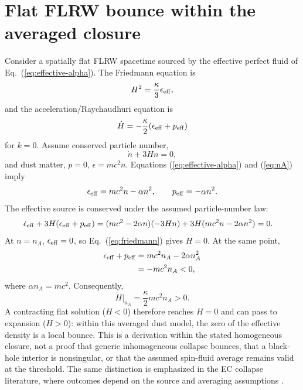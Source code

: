 \documentclass[11pt]{article}
\begin{document}
\section{Flat FLRW bounce within the averaged closure}
Consider a spatially flat FLRW spacetime sourced by the effective perfect fluid of Eq.~(\ref{eq:effective-alpha}). The Friedmann equation is
\begin{equation}
H^2=\frac{\kappa}{3}\epsilon_{\rm eff},
\label{eq:friedmann}
\end{equation}
and the acceleration/Raychaudhuri equation is
\begin{equation}
\dot H=-\frac{\kappa}{2}(\epsilon_{\rm eff}+p_{\rm eff})
\label{eq:hdot}
\end{equation}
for $k=0$. Assume conserved particle number,
\begin{equation}
\dot n+3Hn=0,
\label{eq:number-conservation}
\end{equation}
and dust matter, $p=0$, $\epsilon=mc^2n$. Equations (\ref{eq:effective-alpha}) and (\ref{eq:nA}) imply
\begin{equation}
\epsilon_{\rm eff}=mc^2n-\alpha n^2,
\qquad p_{\rm eff}=-\alpha n^2.
\end{equation}
The effective source is conserved under the assumed particle-number law:
\begin{align}
\dot\epsilon_{\rm eff}+3H(\epsilon_{\rm eff}+p_{\rm eff})
&=(mc^2-2\alpha n)(-3Hn)+3H(mc^2n-2\alpha n^2)=0.
\end{align}
At $n=n_A$, $\epsilon_{\rm eff}=0$, so Eq.~(\ref{eq:friedmann}) gives $H=0$. At the same point,
\begin{align}
\epsilon_{\rm eff}+p_{\rm eff}
&=mc^2n_A-2\alpha n_A^2\\
&=-mc^2n_A<0,
\end{align}
where $\alpha n_A=mc^2$. Consequently,
\begin{equation}
\boxed{\dot H\big|_{n_A}=\frac{\kappa}{2}mc^2n_A>0.}
\label{eq:bounce}
\end{equation}
A contracting flat solution ($H<0$) therefore reaches $H=0$ and can pass to expansion ($H>0$): within this averaged dust model, the zero of the effective density is a local bounce. This is a derivation within the stated homogeneous closure, not a proof that generic inhomogeneous collapse bounces, that a black-hole interior is nonsingular, or that the assumed spin-fluid average remains valid at the threshold. The same distinction is emphasized in the EC collapse literature, where outcomes depend on the source and averaging assumptions \cite{Ziaie2014}.
\end{document}
